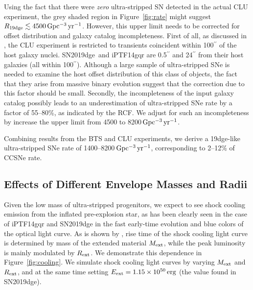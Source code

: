 \documentclass[twocolumn]{aastex63}
\newcommand{\name}{SN2019dge}
\begin{document}
\begin{CJK*}{UTF8}{gbsn}
Using the fact that there were \textit{zero} ultra-stripped SN detected in the actual CLU experiment, 
the 
grey shaded region in Figure~\ref{fig:rate} might suggest $R_{\rm 19dge}\lesssim 4500\,{\rm 
Gpc^{-3}\,yr^{-1}}$. However, this upper limit needs to be corrected for offset 
distribution and galaxy catalog incompleteness. First of all, as discussed in \citet{De2020b}, the CLU 
experiment is restricted to transients coincident within 100$^{\prime\prime}$ of the host galaxy nuclei. 
\name\ and iPTF14gqr are 0.5$^{\prime\prime}$ and 24$^{\prime\prime}$ from their host galaxies (all 
within 100$^{\prime\prime}$). Although a large sample of ultra-stripped SNe is needed to examine the 
host offset distribution of this class of objects, the fact that they arise from massive binary evolution 
suggest that the correction due to this factor should be small. Secondly, the incompleteness of the 
input galaxy catalog possibly leads to an underestimation of ultra-stripped SNe rate by a factor of 
55--80\%, as indicated by the RCF. We adjust for such an incompleteness by increase the upper limit 
from 4500 to 8200\,${\rm Gpc^{-3}\,yr^{-1}}$.

Combining results from the BTS and CLU experiments, we derive a 19dge-like ultra-stripped SNe rate of 
1400--8200\,${\rm Gpc^{-3}\,yr^{-1}}$, corresponding to 2--12\% of CCSNe rate.

\subsection{Effects of Different Envelope Masses and Radii} 
\label{subsubsec:physics}
Given the low mass of ultra-stripped progenitors, we expect to see shock cooling emission from the 
inflated pre-explosion star, as has been clearly seen in the case of iPTF14gqr and SN2019dge in the 
fast early-time evolution and blue colors of the optical light curve. As is shown by 
\citet[][Fig. 2]{Nakar2014}, rise time of the shock cooling light curve is determined by mass of the 
extended material $M_{\rm ext}$, while the peak luminosity is mainly modulated by $R_{\rm ext}$. We 
demonstrate this dependence in Figure~\ref{fig:cooling}. We simulate shock cooling light curves by 
varying $M_{\rm ext}$ and $R_{\rm ext}$, and at the same time setting $E_{\rm ext}=1.15\times 
10^{50}\,{\rm erg}$ (the value found in \name). 


\end{CJK*}
\end{document}
